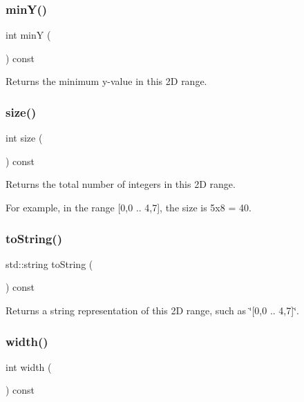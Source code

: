 \subsubsection{\texorpdfstring{min\+Y()}{minY()}}
{\footnotesize\ttfamily int minY (\begin{DoxyParamCaption}{ }\end{DoxyParamCaption}) const}



Returns the minimum y-\/value in this 2D range. 

\mbox{\label{classIntRange2D_af9593d4a5ff4274efaf429cb4f9e57cc}} 
\subsubsection{\texorpdfstring{size()}{size()}}
{\footnotesize\ttfamily int size (\begin{DoxyParamCaption}{ }\end{DoxyParamCaption}) const}



Returns the total number of integers in this 2D range. 

For example, in the range \mbox{[}0,0 .. 4,7\mbox{]}, the size is 5x8 = 40. \mbox{\label{classIntRange2D_a1fe5121d6528fdea3f243321b3fa3a49}} 
\subsubsection{\texorpdfstring{to\+String()}{toString()}}
{\footnotesize\ttfamily std\+::string to\+String (\begin{DoxyParamCaption}{ }\end{DoxyParamCaption}) const}



Returns a string representation of this 2D range, such as \char`\"{}\mbox{[}0,0 .. 4,7\mbox{]}\char`\"{}. 

\mbox{\label{classIntRange2D_ad72663daf610f2a0833a2fc3d78e4fdf}} 
\subsubsection{\texorpdfstring{width()}{width()}}
{\footnotesize\ttfamily int width (\begin{DoxyParamCaption}{ }\end{DoxyParamCaption}) const}




